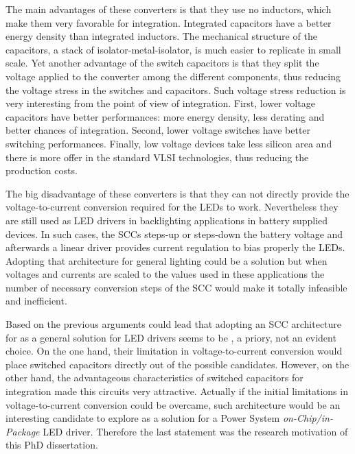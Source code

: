 The main advantages of these converters is that they use no inductors, which make them very favorable for integration. Integrated capacitors have a better energy density than integrated inductors. The mechanical structure of the capacitors, a stack of isolator-metal-isolator, is much easier to replicate in small scale. Yet another advantage of the switch capacitors is that they split the voltage applied to the converter among the different components, thus reducing the voltage stress in the switches and capacitors. Such voltage stress reduction is very interesting from the point of view of integration. First, lower voltage capacitors have better performances: more energy density, less derating and better chances of integration. Second, lower voltage switches have better switching performances. Finally, low voltage devices take less silicon area and there is more offer in the standard VLSI technologies, thus reducing the production costs.

The big disadvantage of these converters is that they can not directly provide the voltage-to-current conversion required for the LEDs to work. Nevertheless they are still used as LED drivers in backlighting applications in battery supplied devices. In such cases, the SCCs steps-up or steps-down the battery voltage and afterwards a linear driver  provides current regulation to bias properly the LEDs. Adopting that architecture for general lighting could be a solution but when  voltages and currents are scaled to the values used in these applications the number of necessary conversion steps of the SCC would make it totally infeasible and inefficient.

Based on the previous arguments could lead that adopting an SCC architecture for as a general solution for LED drivers seems to be , a priory,  not an evident choice. On the one hand, their limitation in voltage-to-current conversion would place switched capacitors directly out of the possible candidates. However, on the other hand, the advantageous characteristics of switched capacitors for integration made this circuits very attractive. Actually if the initial limitations in voltage-to-current conversion could be overcame, such architecture would be an interesting candidate to explore as a solution for a Power System \emph{on-Chip/in-Package} LED driver. Therefore the last statement was the research motivation  of this PhD dissertation.


